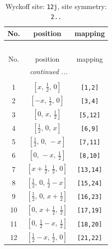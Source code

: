 \documentclass[fleqn,8pt]{jsarticle}
\begin{document}
\begin{longtable}{ccc}
\caption{Wyckoff site: {\tt 12j}, site symmetry: {\tt 2..}}
 \\
 \hline \hline
No. & position & mapping \\ \hline \endfirsthead

\multicolumn{2}{l}{\tablename\ \thetable{}} \\
 \hline \hline
No. & position & mapping \\ \hline \endhead

 \hline \hline
\multicolumn{2}{r}{\footnotesize\it continued ...} \\ \endfoot

 \hline \hline
\multicolumn{2}{r}{} \\ \endlastfoot

1 & $\left[ x,\, \frac{1}{2},\, 0 \right]$ & {\tt [1,2]} \\ \hline
2 & $\left[ - x,\, \frac{1}{2},\, 0 \right]$ & {\tt [3,4]} \\ \hline
3 & $\left[ 0,\, x,\, \frac{1}{2} \right]$ & {\tt [5,12]} \\ \hline
4 & $\left[ \frac{1}{2},\, 0,\, x \right]$ & {\tt [6,9]} \\ \hline
5 & $\left[ \frac{1}{2},\, 0,\, - x \right]$ & {\tt [7,11]} \\ \hline
6 & $\left[ 0,\, - x,\, \frac{1}{2} \right]$ & {\tt [8,10]} \\ \hline
7 & $\left[ x + \frac{1}{2},\, \frac{1}{2},\, 0 \right]$ & {\tt [13,14]} \\ \hline
8 & $\left[ \frac{1}{2},\, 0,\, \frac{1}{2} - x \right]$ & {\tt [15,24]} \\ \hline
9 & $\left[ \frac{1}{2},\, 0,\, x + \frac{1}{2} \right]$ & {\tt [16,23]} \\ \hline
10 & $\left[ 0,\, x + \frac{1}{2},\, \frac{1}{2} \right]$ & {\tt [17,19]} \\ \hline
11 & $\left[ 0,\, \frac{1}{2} - x,\, \frac{1}{2} \right]$ & {\tt [18,20]} \\ \hline
12 & $\left[ \frac{1}{2} - x,\, \frac{1}{2},\, 0 \right]$ & {\tt [21,22]} \\
\end{longtable}
\renewcommand{\arraystretch}{1.2}
\end{document}
